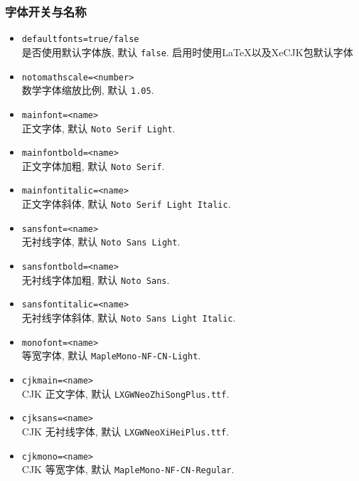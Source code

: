 \documentclass[12pt]{article}
\begin{document}
	\subsubsection{字体开关与名称}
	\begin{itemize}[itemsep=1ex]
		\item \texttt{defaultfonts=true/false}\\
		是否使用默认字体族, 默认 \texttt{false}. 启用时使用LaTeX以及XeCJK包默认字体
		
		\item \texttt{notomathscale=<number>}\\
		数学字体缩放比例, 默认 \texttt{1.05}.
		
		\item \texttt{mainfont=<name>}\\
		正文字体, 默认 \texttt{Noto Serif Light}.
		
		\item \texttt{mainfontbold=<name>}\\
		正文字体加粗, 默认 \texttt{Noto Serif}.
		
		\item \texttt{mainfontitalic=<name>}\\
		正文字体斜体, 默认 \texttt{Noto Serif Light Italic}.
		
		\item \texttt{sansfont=<name>}\\
		无衬线字体, 默认 \texttt{Noto Sans Light}.
		
		\item \texttt{sansfontbold=<name>}\\
		无衬线字体加粗, 默认 \texttt{Noto Sans}.
		
		\item \texttt{sansfontitalic=<name>}\\
		无衬线字体斜体, 默认 \texttt{Noto Sans Light Italic}.
		
		\item \texttt{monofont=<name>}\\
		等宽字体, 默认 \texttt{MapleMono-NF-CN-Light}.
		
		\item \texttt{cjkmain=<name>}\\
		CJK 正文字体, 默认 \texttt{LXGWNeoZhiSongPlus.ttf}.
		
		\item \texttt{cjksans=<name>}\\
		CJK 无衬线字体, 默认 \texttt{LXGWNeoXiHeiPlus.ttf}.
		
		\item \texttt{cjkmono=<name>}\\
		CJK 等宽字体, 默认 \texttt{MapleMono-NF-CN-Regular}.
	\end{itemize}
	
\end{document}
